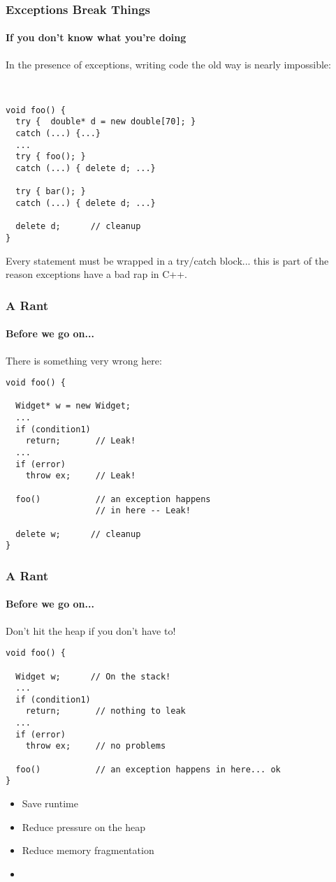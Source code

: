 \begin{frame}[fragile,t]
\frametitle{Exceptions Break Things}
\framesubtitle{If you don't know what you're doing}
In the presence of exceptions, writing code the old way is nearly impossible:
{\scriptsize\
\begin{verbatim}
void foo() {
  try {  double* d = new double[70]; }
  catch (...) {...}
  ...
  try { foo(); }
  catch (...) { delete d; ...}

  try { bar(); } 
  catch (...) { delete d; ...}

  delete d;      // cleanup
}
\end{verbatim}
}
Every statement must be wrapped in a try/catch block... this is part of the reason exceptions have a bad rap in C++.
\end{frame}



\begin{frame}[fragile,t]
\frametitle{A Rant}
\framesubtitle{Before we go on...}
There is something very wrong here:
\pause{}
{\scriptsize \begin{verbatim}
void foo() {

  Widget* w = new Widget;
  ...
  if (condition1)
    return;       // Leak!
  ...
  if (error)
    throw ex;     // Leak!

  foo()           // an exception happens
                  // in here -- Leak!

  delete w;      // cleanup 
}
\end{verbatim}}
\pause
{}

\end{frame}

\begin{frame}[fragile,t]
\frametitle{A Rant}
\framesubtitle{Before we go on...}
Don't hit the heap if you don't have to!

{\scriptsize \begin{verbatim}
void foo() {

  Widget w;      // On the stack!
  ...
  if (condition1)
    return;       // nothing to leak
  ...
  if (error)
    throw ex;     // no problems

  foo()           // an exception happens in here... ok
}
\end{verbatim}}
\pause{}
\begin{itemize}
\item Save runtime
\item Reduce pressure on the heap
\item Reduce memory fragmentation
\pause{}
\item {}
\end{itemize}

\end{frame}


